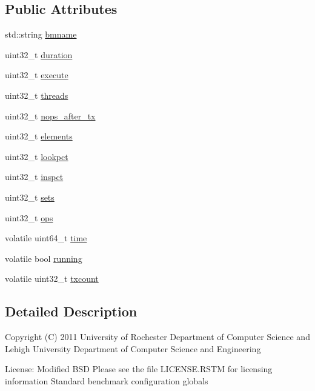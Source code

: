 \subsection*{Public Attributes}
\begin{DoxyCompactItemize}
\item 
std\-::string \hyperlink{structConfig_a36abcce8fa735a30cde03c76c1387dde}{bmname}
\item 
uint32\-\_\-t \hyperlink{structConfig_a9d8bcac76a0609ba1ea01296d6e6ac50}{duration}
\item 
uint32\-\_\-t \hyperlink{structConfig_accbe68e2bbec1e973974a9ecdd729feb}{execute}
\item 
uint32\-\_\-t \hyperlink{structConfig_a870c958ae8404dd3942c3769f5a43e15}{threads}
\item 
uint32\-\_\-t \hyperlink{structConfig_aaafe44fc645640b5ad7f893ccfbf0d6a}{nops\-\_\-after\-\_\-tx}
\item 
uint32\-\_\-t \hyperlink{structConfig_a7789ee6878dd4f6623510b360c8c229b}{elements}
\item 
uint32\-\_\-t \hyperlink{structConfig_a6e52054fe035a0a2465dac2e1e5d5901}{lookpct}
\item 
uint32\-\_\-t \hyperlink{structConfig_a70996dfcb24e83d7a169b0936664f381}{inspct}
\item 
uint32\-\_\-t \hyperlink{structConfig_ac4e34cfcf9f40e7dee79afe625cfb071}{sets}
\item 
uint32\-\_\-t \hyperlink{structConfig_aa1d5884a1708cdc5ff1b20251087e200}{ops}
\item 
volatile uint64\-\_\-t \hyperlink{structConfig_a951db08a5d4bd2805fdc5a1e10171831}{time}
\item 
volatile bool \hyperlink{structConfig_ab76502ae4dfab5fae15aecb8f5777027}{running}
\item 
volatile uint32\-\_\-t \hyperlink{structConfig_a2bd671f1afa6a6cf33a85f783ef9ae9f}{txcount}
\end{DoxyCompactItemize}


\subsection{Detailed Description}
Copyright (C) 2011 University of Rochester Department of Computer Science and Lehigh University Department of Computer Science and Engineering

License\-: Modified B\-S\-D Please see the file L\-I\-C\-E\-N\-S\-E.\-R\-S\-T\-M for licensing information Standard benchmark configuration globals 

